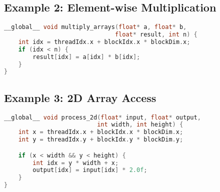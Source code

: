 \documentclass[11pt, a4paper]{article}
\begin{document}
\subsection*{Example 2: Element-wise Multiplication}
\begin{lstlisting}[language=C]
__global__ void multiply_arrays(float* a, float* b,
                               float* result, int n) {
    int idx = threadIdx.x + blockIdx.x * blockDim.x;
    if (idx < n) {
        result[idx] = a[idx] * b[idx];
    }
}
\end{lstlisting}

\subsection*{Example 3: 2D Array Access}
\begin{lstlisting}[language=C]
__global__ void process_2d(float* input, float* output,
                          int width, int height) {
    int x = threadIdx.x + blockIdx.x * blockDim.x;
    int y = threadIdx.y + blockIdx.y * blockDim.y;

    if (x < width && y < height) {
        int idx = y * width + x;
        output[idx] = input[idx] * 2.0f;
    }
}
\end{lstlisting}
\end{document}
